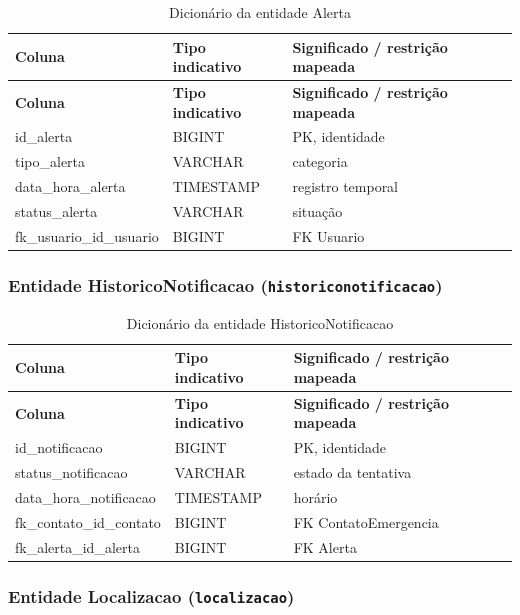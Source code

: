 \begin{longtable}{p{4.8cm}p{3.05cm}p{5.05cm}}
\caption{Dicionário da entidade Alerta}\label{quad_alerta}\\
\hline
\textbf{Coluna} & \textbf{Tipo indicativo} & \textbf{Significado / restrição mapeada} \\
\hline
\endfirsthead
\hline\textbf{Coluna} & \textbf{Tipo indicativo} & \textbf{Significado / restrição mapeada} \\
\hline
\endhead
id\_alerta & BIGINT & PK, identidade \\
\hline
tipo\_alerta & VARCHAR & categoria \\
\hline
data\_hora\_alerta & TIMESTAMP & registro temporal \\
\hline
status\_alerta & VARCHAR & situação \\
\hline
fk\_usuario\_id\_usuario & BIGINT & FK Usuario \\
\hline
\end{longtable}

\subsubsection{Entidade HistoricoNotificacao (\texttt{historiconotificacao})}

\begin{longtable}{p{4.8cm}p{3.05cm}p{5.05cm}}
\caption{Dicionário da entidade HistoricoNotificacao}\label{quad_historiconotificacao}\\
\hline
\textbf{Coluna} & \textbf{Tipo indicativo} & \textbf{Significado / restrição mapeada} \\
\hline
\endfirsthead
\hline\textbf{Coluna} & \textbf{Tipo indicativo} & \textbf{Significado / restrição mapeada} \\
\hline
\endhead
id\_notificacao & BIGINT & PK, identidade \\
\hline
status\_notificacao & VARCHAR & estado da tentativa \\
\hline
data\_hora\_notificacao & TIMESTAMP & horário \\
\hline
fk\_contato\_id\_contato & BIGINT & FK ContatoEmergencia \\
\hline
fk\_alerta\_id\_alerta & BIGINT & FK Alerta \\
\hline
\end{longtable}

\subsubsection{Entidade Localizacao (\texttt{localizacao})}

